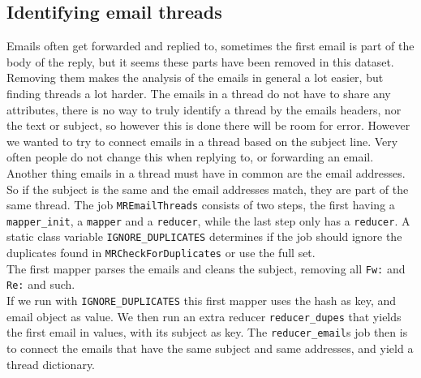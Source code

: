 \documentclass[runningheads,a4paper]{llncs}
\begin{document}
\subsection{Identifying email threads}
\label{sec:emailthreads}
Emails often get forwarded and replied to, sometimes the first email is part of the body of the reply, but it seems these parts have been removed in this dataset. Removing them makes the analysis of the emails in general a lot easier, but finding threads a lot harder. The emails in a thread do not have to share any attributes, there is no way to truly identify a thread by the emails headers, nor the text or subject, so however this is done there will be room for error. However we wanted to try to connect emails in a thread based on the subject line. Very often people do not change this when replying to, or forwarding an email. Another thing emails in a thread must have in common are the email addresses. So if the subject is the same and the email addresses match, they are part of the same thread.
\newline
The job \verb!MREmailThreads! consists of two steps, the first having a \verb!mapper_init!, a \verb!mapper! and a \verb!reducer!, while the last step only has a \verb!reducer!. A static class variable \verb!IGNORE_DUPLICATES! determines if the job should ignore the duplicates found in \verb!MRCheckForDuplicates! or use the full set.
\\
The first mapper parses the emails and cleans the subject, removing all \verb!Fw:! and \verb!Re:! and such.
\\
If we run with \verb!IGNORE_DUPLICATES! this first mapper uses the hash as key, and email object as value. We then run an extra reducer \verb!reducer_dupes! that yields the first email in values, with its subject as key.
\newline
The \verb!reducer_email!s job then is to connect the emails that have the same subject and same addresses, and yield a thread dictionary.
\end{document}
